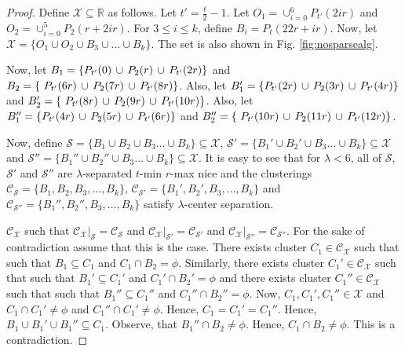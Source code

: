 \documentclass[anon,12pt]{colt2016} %
\newcommand{\mc}{\mathcal}
\begin{document}
\begin{proof}
Define $\mc X \subseteq \mathbb{R}$ as follows. Let $t' = \frac{t}{2}-1$. Let $O_1 = \cup_{i=0}^6 P_{t'}(2ir)$ and $O_2 = \cup_{i=0}^5 P_2(r+2ir)$. For $3\le i\le k$, define $B_i = P_t(22r+ir)$. Now, let $\mc X = \{O_1 \cup O_2 \cup B_3 \cup \ldots \cup B_k\}$. The set is also shown in Fig. \ref{fig:nosparsealg}.

Now, let $B_1 = \{P_{t'}(0) \thinspace\cup\thinspace  P_{2}(r) \thinspace\cup\thinspace P_{t'}(2r) \}$ and $B_2 = \{\ P_{t'}(6r) \thinspace\cup\thinspace P_{2}(7r)\thinspace\cup\thinspace P_{t'}(8r)\}$. Also, let $B_1' = \{P_{t'}(2r) \thinspace\cup\thinspace  P_{2}(3r) \thinspace\cup\thinspace P_{t'}(4r) \}$ and $B_2' = \{\ P_{t'}(8r) \thinspace\cup\thinspace P_{2}(9r)\thinspace\cup\thinspace P_{t'}(10r)\}$. Also, let $B_1'' = \{P_{t'}(4r) \thinspace\cup\thinspace  P_{2}(5r) \thinspace\cup\thinspace P_{t'}(6r) \}$ and $B_2'' = \{\ P_{t'}(10r) \thinspace\cup\thinspace P_{2}(11r)\thinspace\cup\thinspace P_{t'}(12r)\}$. 

Now, define $\mc S = \{B_1 \cup B_2 \cup B_3\ldots \cup B_k\} \subseteq \mc X$, $\mc S' = \{B_1' \cup B_2' \cup B_3\ldots \cup B_k\} \subseteq \mc X$ and $\mc S'' = \{B_1'' \cup B_2'' \cup B_3\ldots \cup B_k\} \subseteq \mc X$. It is easy to see that for $\lambda < 6$, all of $\mc S$, $\mc S'$ and $\mc S''$ are $\lambda$-separated $t$-min $r$-max nice and the clusterings $\mc C_{\mc S} = \{B_1, B_2, B_3, \ldots, B_k\}$, $\mc C_{\mc S'} = \{B_1', B_2', B_3, \ldots, B_k\}$ and $\mc C_{\mc S''} = \{B_1'', B_2'', B_3, \ldots, B_k\}$ satisfy $\lambda$-center separation.

$\mc C_{\mc X}$ such that $\mc C_{\mc X}|_{\mc S} = \mc C_{\mc S}$ and $\mc C_{\mc X}|_{\mc S'} = \mc C_{\mc S'}$ and $\mc C_{\mc X}|_{\mc S''} = \mc C_{\mc S''}$. For the sake of contradiction assume that this is the case. There exists cluster $C_1 \in \mc C_{\mc X}$ such that such that $B_1 \subseteq C_1$ and $C_1 \cap B_2 = \phi$. Similarly, there exists cluster $C_1' \in \mc C_{\mc X}$ such that such that $B_1' \subseteq C_1'$ and $C_1' \cap B_2' = \phi$ and there exists cluster $C_1'' \in \mc C_{\mc X}$ such that such that $B_1'' \subseteq C_1''$ and $C_1'' \cap B_2'' = \phi$. Now, $C_1, C_1', C_1'' \in \mc X$ and $C_1 \cap C_1' \neq \phi$ and $C_1'' \cap C_1' \neq \phi$. Hence, $C_1 = C_1' = C_1''$. Hence, $B_1 \cup B_1' \cup B_1'' \subseteq C_1$. Observe, that $B_1'' \cap B_2 \neq \phi$. Hence, $C_1\cap B_2 \neq \phi$. This is a contradiction.
\end{proof}



 
\end{document}
